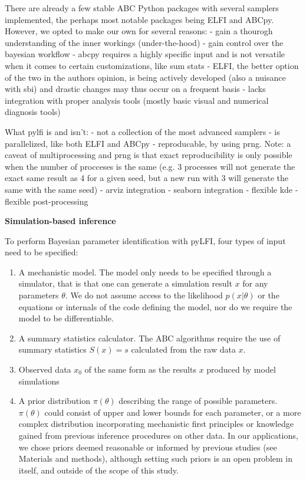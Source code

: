 There are already a few stable ABC Python packages with several samplers implemented, the perhaps most notable packages being ELFI and ABCpy. However, we opted to make our own for several reasons:
- gain a thourogh understanding of the inner workings (under-the-hood)
- gain control over the bayesian workflow 
- abcpy requires a highly specific input and is not versatile when it comes to certain customizations, like sum stats
- ELFI, the better option of the two in the authors opinion, is being actively developed (also a nuisance with sbi) and drastic changes may thus occur on a frequent basis
- lacks integration with proper analysis tools (mostly basic visual and numerical diagnosis tools)

What pylfi is and isn’t:
- not a collection of the most advanced samplers
- is parallelized, like both ELFI and ABCpy
- reproducable, by using prng. Note: a caveat of multiprocessing and prng is that exact reproducibility is only possible when the number of procceses is the same (e.g. 3 processes will not generate the exact same result as 4 for a given seed, but a new run with 3 will generate the same with the same seed)
- arviz integration
- seaborn integration
- flexible kde
- flexible post-processing


\textbf{Simulation-based inference} 


To perform Bayesian parameter identification with pyLFI, four types of input need to be specified: 

\begin{enumerate}
    \item A mechanistic model. The model only needs to be specified through a simulator, that is that one can generate a simulation result $x$ for any parameters $\theta$. We do not assume access to the likelihood $p(x | \theta)$ or the equations or internals of the code defining the model, nor do we require the model to be differentiable. 
    \item A summary statistics calculator. The ABC algorithms require the use of summary statistics $S(x)=s$ calculated from the raw data $x$. 
    \item Observed data $x_0$ of the same form as the results $x$ produced by model simulations
    \item A prior distribution $\pi (\theta)$ describing the range of possible parameters. $\pi (\theta)$ could consist of upper and lower bounds for each parameter, or a more complex distribution incorporating mechanistic first principles or knowledge gained from previous inference procedures on other data. In our applications, we chose priors deemed reasonable or informed by previous studies (see Materials and methods), although setting such priors is an open problem in itself, and outside of the scope of this study.
\end{enumerate}

